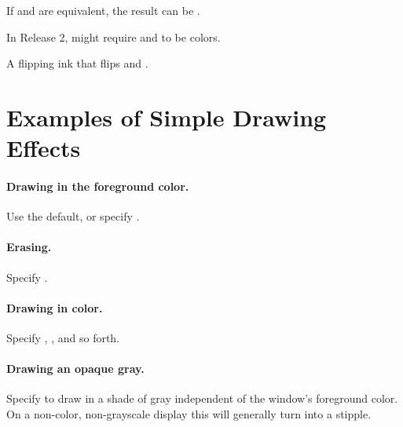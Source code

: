 If  and  are equivalent, the result can be
.

In Release 2,  might require  and
 to be colors.



A flipping ink that flips  and .


\section {Examples of Simple Drawing Effects}

\paragraph {Drawing in the foreground color.}

Use the default, or specify .

\paragraph {Erasing.}

Specify .

\paragraph {Drawing in color.}

Specify , , and so forth.

\paragraph {Drawing an opaque gray.}

Specify  to draw in a shade of gray independent
of the window's foreground color.  On a non-color, non-grayscale display this
will generally turn into a stipple.
